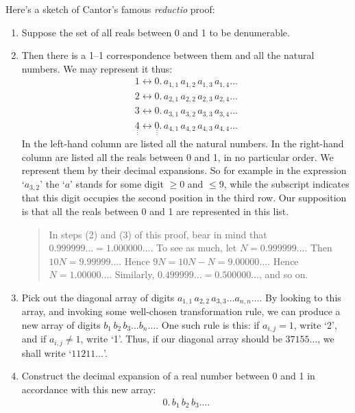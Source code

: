 \documentclass[twoside,openright]{article}
\begin{document}
\begin{enumerate}
Here's a sketch of Cantor's famous \emph{reductio}
proof:\label{nondenumerableproof}
\begin{enumerate}[(1)]
\item Suppose the set of all reals between 0 and 1 to be denumerable.
\item \label{steptwo}Then there is a 1--1 correspondence between them
  and all the natural numbers. We may represent it thus:
  \begin{align*}
    1\leftrightarrow0.\,a_{1, 1}\,a_{1, 2}\,a_{1, 3}\,a_{1, 4}\dotsc \\
    2\leftrightarrow0.\,a_{2, 1}\,a_{2, 2}\,a_{2, 3}\,a_{2, 4}\dotsc \\
    3\leftrightarrow0.\,a_{3, 1}\,a_{3, 2}\,a_{3, 3}\,a_{3, 4}\dotsc \\
    \underset{\vdots}{4}\leftrightarrow\underset{\vdots}{0}.\,a_{4, 1}\,a_{4, 2}\,a_{4, 3}\,a_{4, 4}\dotsc
  \end{align*}
  \label{expansion}In the left-hand column are listed all the natural
  numbers. In the right-hand column are listed all the reals between 0
  and 1, in no particular order. We represent them by their decimal
  expansions. So for example in the expression `$a_{3,2}$' the `$a$'
  stands for some digit $\geq0$ and $\leq9$, while the subscript
  indicates that this digit occupies the second position in the third
  row. Our supposition is that all the reals between 0 and 1 are
  represented in this list.
  \begin{quote} {\small In steps (2) and (3) of this proof, bear in
      mind that $0.999999\dotsc=1.000000\dotsc$. To see as much, let
      $N=0.999999\dotsc$. Then $10N=9.99999\dotsc$. Hence
      $9N=10N-N=9.00000\dotsc$. Hence $N=1.00000\dotsc$. Similarly,
      $0.499999\dotsc=0.500000\dotsc$, and so
      on.}\label{noninfinitesimal}
  \end{quote}
\item Pick out the diagonal array of digits
  $a_{1,1}\,a_{2,2}\,a_{3,3}\dotsc a_{n,n}\dotsc$. By looking to this
  array, and invoking some well-chosen transformation rule, we can
  produce a new array of digits $b_1\,b_2\,b_3\dotsc b_n\dotsc$. One
  such rule is this: if $a_{i,j}=1$, write `2', and if $a_{i,j}\neq1$,
  write `1'. Thus, if our diagonal array should be $37155\dotsc$, we
  shall write `$11211\dotsc$'.
\item Construct the decimal expansion of a real number between 0 and 1
  in accordance with this new array:
  \begin{align*}
    0.\,b_1\,b_2\,b_3\ldots.

\end{align*}
\end{enumerate}
\end{enumerate}
\end{document}
